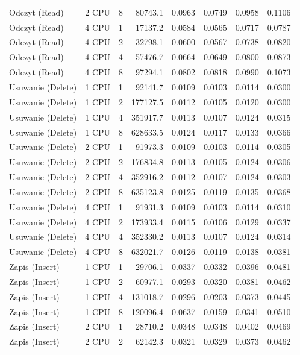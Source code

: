 \begin{table}[ht]
{\begin{tabular}{llcrrrrr}
Odczyt (Read) & 2 CPU & 8 & 80743.1 & 0.0963 & 0.0749 & 0.0958 & 0.1106 \\
Odczyt (Read) & 4 CPU & 1 & 17137.2 & 0.0584 & 0.0565 & 0.0717 & 0.0787 \\
Odczyt (Read) & 4 CPU & 2 & 32798.1 & 0.0600 & 0.0567 & 0.0738 & 0.0820 \\
Odczyt (Read) & 4 CPU & 4 & 57476.7 & 0.0664 & 0.0649 & 0.0800 & 0.0873 \\
Odczyt (Read) & 4 CPU & 8 & 97294.1 & 0.0802 & 0.0818 & 0.0990 & 0.1073 \\
Usuwanie (Delete) & 1 CPU & 1 & 92141.7 & 0.0109 & 0.0103 & 0.0114 & 0.0300 \\
Usuwanie (Delete) & 1 CPU & 2 & 177127.5 & 0.0112 & 0.0105 & 0.0120 & 0.0300 \\
Usuwanie (Delete) & 1 CPU & 4 & 351917.7 & 0.0113 & 0.0107 & 0.0124 & 0.0315 \\
Usuwanie (Delete) & 1 CPU & 8 & 628633.5 & 0.0124 & 0.0117 & 0.0133 & 0.0366 \\
Usuwanie (Delete) & 2 CPU & 1 & 91973.3 & 0.0109 & 0.0103 & 0.0114 & 0.0305 \\
Usuwanie (Delete) & 2 CPU & 2 & 176834.8 & 0.0113 & 0.0105 & 0.0124 & 0.0306 \\
Usuwanie (Delete) & 2 CPU & 4 & 352916.2 & 0.0112 & 0.0107 & 0.0124 & 0.0303 \\
Usuwanie (Delete) & 2 CPU & 8 & 635123.8 & 0.0125 & 0.0119 & 0.0135 & 0.0368 \\
Usuwanie (Delete) & 4 CPU & 1 & 91931.3 & 0.0109 & 0.0103 & 0.0114 & 0.0310 \\
Usuwanie (Delete) & 4 CPU & 2 & 173933.4 & 0.0115 & 0.0106 & 0.0129 & 0.0337 \\
Usuwanie (Delete) & 4 CPU & 4 & 352330.2 & 0.0113 & 0.0107 & 0.0124 & 0.0314 \\
Usuwanie (Delete) & 4 CPU & 8 & 632021.7 & 0.0126 & 0.0119 & 0.0138 & 0.0381 \\
Zapis (Insert) & 1 CPU & 1 & 29706.1 & 0.0337 & 0.0332 & 0.0396 & 0.0481 \\
Zapis (Insert) & 1 CPU & 2 & 60977.1 & 0.0293 & 0.0320 & 0.0381 & 0.0462 \\
Zapis (Insert) & 1 CPU & 4 & 131018.7 & 0.0296 & 0.0203 & 0.0373 & 0.0445 \\
Zapis (Insert) & 1 CPU & 8 & 120096.4 & 0.0637 & 0.0159 & 0.0341 & 0.0510 \\
Zapis (Insert) & 2 CPU & 1 & 28710.2 & 0.0348 & 0.0348 & 0.0402 & 0.0469 \\
Zapis (Insert) & 2 CPU & 2 & 62142.3 & 0.0321 & 0.0329 & 0.0373 & 0.0462 \\

\end{tabular}}
\end{table}
